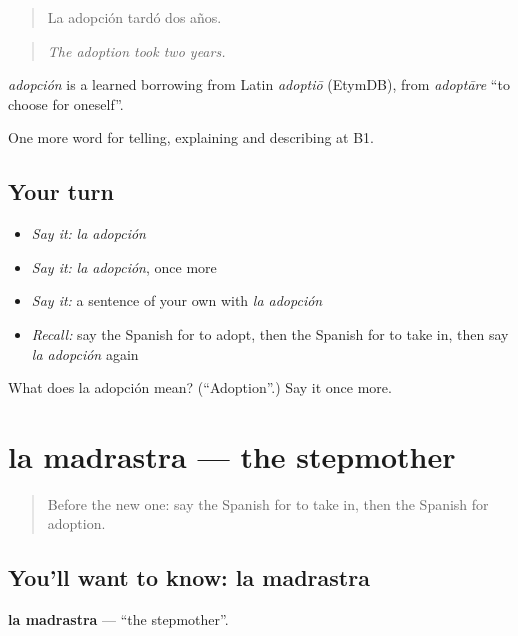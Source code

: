 \begin{quote}
La adopción tardó dos años.
\end{quote}

\begin{quote}
\emph{The adoption took two years.}
\end{quote}

\begin{cousinweb}
\emph{adopción} is a learned borrowing from Latin \emph{adoptiō} (EtymDB), from \emph{adoptāre} \textquotedblleft{}to choose for oneself\textquotedblright{}.
\end{cousinweb}

\begin{grammarlens}[title={What you've built}]
One more word for telling, explaining and describing at B1.
\end{grammarlens}

\subsection*{Your turn}
\begin{itemize}
\raggedright
  \item \emph{Say it:} \emph{la adopción}
  \item \emph{Say it:} \emph{la adopción}, once more
  \item \emph{Say it:} a sentence of your own with \emph{la adopción}
  \item \emph{Recall:} say the Spanish for to adopt, then the Spanish for to take in, then say \emph{la adopción} again
\end{itemize}

\begin{tcolorbox}[breakable,colback=teal!4,colframe=teal!35!black,title={Before you move on}]
What does la adopción mean? (\textquotedblleft{}Adoption\textquotedblright{}.) Say it once more.
\end{tcolorbox}
\section[la madrastra]{la madrastra — the stepmother}

\label{lesson:ES-C748-madrastra}



\begin{quote}
Before the new one: say the Spanish for to take in, then the Spanish for adoption.
\end{quote}

\subsection*{You'll want to know: la madrastra}
\textbf{la madrastra} — \textquotedblleft{}the stepmother\textquotedblright{}.

